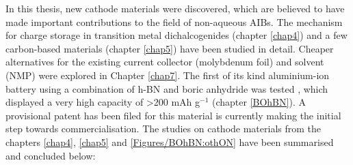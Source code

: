 In this thesis, new cathode materials were discovered, which are believed to have made important contributions to the field of non-aqueous AIBs. The mechanism for charge storage in transition metal dichalcogenides (chapter \ref{chap4}) and a few carbon-based materials (chapter \ref{chap5}) have been studied in detail. Cheaper alternatives for the existing current collector (molybdenum foil) and solvent (NMP) were explored in Chapter \ref{chap7}. The first of its kind aluminium-ion battery using a combination of h-BN and boric anhydride was tested , which displayed a very high capacity  of >200 mAh g$^{-1}$ (chapter \ref{BOhBN}). A provisional patent has been filed for this material is currently making the initial step towards commercialisation. The studies on cathode materials from the chapters \ref{chap4}, \ref{chap5} and \ref{Figures/BOhBN:othON} have been summarised and concluded below:\\
